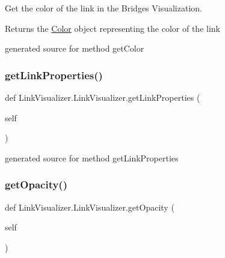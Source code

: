 Get the color of the link in the Bridges Visualization. 

\begin{DoxyReturn}{Returns}
the \hyperlink{namespace_color}{Color} object representing the color of the link\begin{DoxyVerb}generated source for method getColor \end{DoxyVerb}
 
\end{DoxyReturn}
\hypertarget{class_link_visualizer_1_1_link_visualizer_a3f7c130d80995f5c60bef6f63a65b160}{}\label{class_link_visualizer_1_1_link_visualizer_a3f7c130d80995f5c60bef6f63a65b160} 
\subsubsection{\texorpdfstring{get\+Link\+Properties()}{getLinkProperties()}}
{\footnotesize\ttfamily def Link\+Visualizer.\+Link\+Visualizer.\+get\+Link\+Properties (\begin{DoxyParamCaption}\item[{}]{self }\end{DoxyParamCaption})}

\begin{DoxyVerb}generated source for method getLinkProperties \end{DoxyVerb}
 \hypertarget{class_link_visualizer_1_1_link_visualizer_afbaf01b92c027658be7b6335379be81f}{}\label{class_link_visualizer_1_1_link_visualizer_afbaf01b92c027658be7b6335379be81f} 
\subsubsection{\texorpdfstring{get\+Opacity()}{getOpacity()}}
{\footnotesize\ttfamily def Link\+Visualizer.\+Link\+Visualizer.\+get\+Opacity (\begin{DoxyParamCaption}\item[{}]{self }\end{DoxyParamCaption})}



